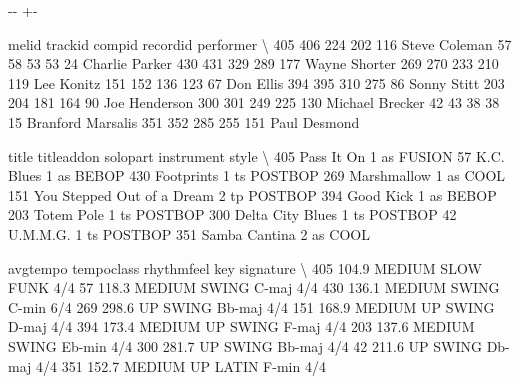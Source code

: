 \documentclass[letterpaper,10pt,english]{sphinxmanual}
\newlength\nbsphinxcodecellspacing
\begin{document}
{

\kern-\sphinxverbatimsmallskipamount\kern-\baselineskip
\kern+\FrameHeightAdjust\kern-\fboxrule
\vspace{\nbsphinxcodecellspacing}

\begin{sphinxVerbatim}[commandchars=\\\{\}]
\llap{\color{nbsphinxout}[6]:\,\hspace{\fboxrule}\hspace{\fboxsep}}     melid  trackid  compid  recordid          performer  \textbackslash{}
405    406      224     202       116      Steve Coleman
57      58       53      53        24     Charlie Parker
430    431      329     289       177      Wayne Shorter
269    270      233     210       119         Lee Konitz
151    152      136     123        67          Don Ellis
394    395      310     275        86        Sonny Stitt
203    204      181     164        90      Joe Henderson
300    301      249     225       130    Michael Brecker
42      43       38      38        15  Branford Marsalis
351    352      285     255       151       Paul Desmond

                          title titleaddon  solopart instrument    style  \textbackslash{}
405                  Pass It On                    1         as   FUSION
57                   K.C. Blues                    1         as    BEBOP
430                  Footprints                    1         ts  POSTBOP
269                 Marshmallow                    1         as     COOL
151  You Stepped Out of a Dream                    2         tp  POSTBOP
394                   Good Kick                    1         as    BEBOP
203                  Totem Pole                    1         ts  POSTBOP
300            Delta City Blues                    1         ts  POSTBOP
42                     U.M.M.G.                    1         ts  POSTBOP
351               Samba Cantina                    2         as     COOL

     avgtempo   tempoclass rhythmfeel     key signature  \textbackslash{}
405     104.9  MEDIUM SLOW       FUNK               4/4
57      118.3       MEDIUM      SWING   C-maj       4/4
430     136.1       MEDIUM      SWING   C-min       6/4
269     298.6           UP      SWING  Bb-maj       4/4
151     168.9    MEDIUM UP      SWING   D-maj       4/4
394     173.4    MEDIUM UP      SWING   F-maj       4/4
203     137.6       MEDIUM      SWING  Eb-min       4/4
300     281.7           UP      SWING  Bb-maj       4/4
42      211.6           UP      SWING  Db-maj       4/4
351     152.7    MEDIUM UP      LATIN   F-min       4/4


\end{sphinxVerbatim}}
\end{document}

